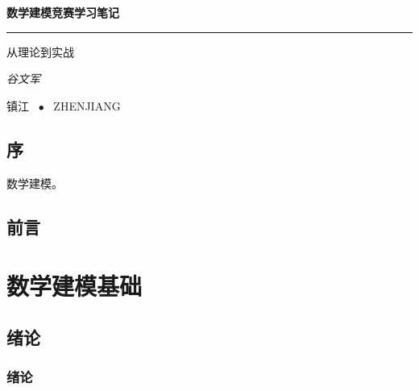 \documentclass[openany]{progbookcn}
\begin{document}
\begin{titlepage}
  \vspace*{25ex}

  \hspace{0.05\textwidth}\begin{minipage}{.9\textwidth}
    \flushright

    {\textbf{数学建模竞赛学习笔记}}

    \rule{\linewidth}{.5pt}

    \vspace{2ex}

    {\textsf{从理论到实战}} \\

    \vspace{20ex}

    {\textit{谷文军}}
  \end{minipage}

  \vfill

  \centering
  {镇江 ~$\bullet$ ~ZHENJIANG}
\end{titlepage}
\thispagestyle{empty}


\frontmatter


\chapter{序}

数学建模。

\chapter{前言}


\clearpage
{
  \hypersetup{hidelinks}
  \tableofcontents
}


\mainmatter

\part{数学建模基础}


\chapter{绪论}



\section{绪论}
\end{document}
